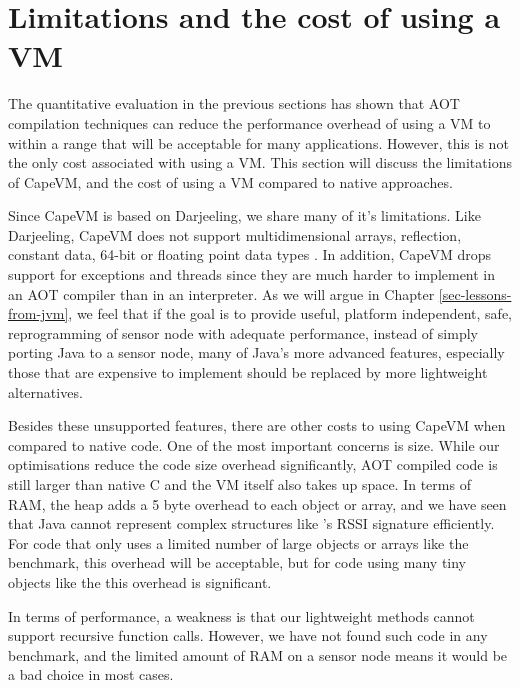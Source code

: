 \section{Limitations and the cost of using a VM}
\label{sec-evaluation-limitations}
The quantitative evaluation in the previous sections has shown that AOT compilation techniques can reduce the performance overhead of using a VM to within a range that will be acceptable for many applications. However, this is not the only cost associated with using a VM. This section will discuss the limitations of CapeVM, and the cost of using a VM compared to native approaches.

Since CapeVM is based on Darjeeling, we share many of it's limitations. Like Darjeeling, CapeVM does not support multidimensional arrays, reflection, constant data, 64-bit or floating point data types \cite{Brouwers:2009cj}. In addition, CapeVM drops support for exceptions and threads since they are much harder to implement in an AOT compiler than in an interpreter. As we will argue in Chapter \ref{sec-lessons-from-jvm}, we feel that if the goal is to provide useful, platform independent, safe, reprogramming of sensor node with adequate performance, instead of simply porting Java to a sensor node, many of Java's more advanced features, especially those that are expensive to implement should be replaced by more lightweight alternatives.

Besides these unsupported features, there are other costs to using CapeVM when compared to native code. One of the most important concerns is size. While our optimisations reduce the code size overhead significantly, AOT compiled code is still larger than native C and the VM itself also takes up space. In terms of RAM, the heap adds a 5 byte overhead to each object or array, and we have seen that Java cannot represent complex structures like 's RSSI signature efficiently. For code that only uses a limited number of large objects or arrays like the  benchmark, this overhead will be acceptable, but for code using many tiny objects like the  this overhead is significant.

In terms of performance, a weakness is that our lightweight methods cannot support recursive function calls. However, we have not found such code in any benchmark, and the limited amount of RAM on a sensor node means it would be a bad choice in most cases.

